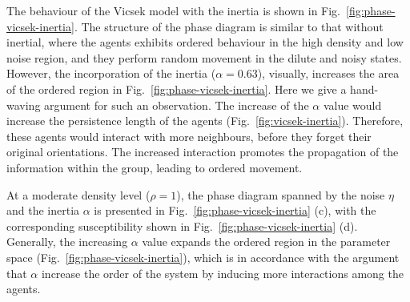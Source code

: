 \documentclass[11pt,twoside]{report}
\begin{document}
The behaviour of the Vicsek model with the inertia is shown in Fig.~\ref{fig:phase-vicsek-inertia}. The structure of the phase diagram
is similar to that without inertial, where the agents exhibits ordered behaviour in the high density and low noise region, and they perform random movement in the dilute and noisy states. However, the incorporation of the inertia ($\alpha = 0.63$), visually, increases the area of the ordered region in Fig.~\ref{fig:phase-vicsek-inertia}.
Here we give a hand-waving argument for such an observation. The increase of the $\alpha$ value would increase the persistence length of the agents (Fig.~\ref{fig:vicsek-inertia}). Therefore, these agents would interact with more neighbours, before they forget their original orientations. The increased interaction promotes the propagation of the information within the group, leading to ordered movement.


At a moderate density level ($\rho = 1$), the phase diagram spanned by the noise $\eta$ and the inertia $\alpha$ is presented in Fig.~\ref{fig:phase-vicsek-inertia} (c), with the corresponding susceptibility shown in Fig.~\ref{fig:phase-vicsek-inertia} (d). Generally, the increasing $\alpha$ value expands the ordered region in the parameter space (Fig.~\ref{fig:phase-vicsek-inertia}), which is in accordance with the argument that $\alpha$ increase the order of the system by inducing more interactions among the agents.%
\end{document}
